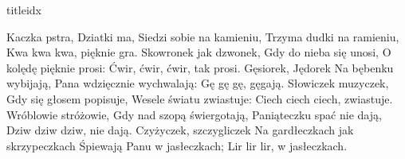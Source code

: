 \documentclass[a5paper, portrait, 12pt]{mwart}
\begin{document}
\begin{songs}{titleidx}


\beginverse
    Kaczka pstra, Dziatki ma,
\endverse
\beginchorus
    Siedzi sobie na kamieniu,
    Trzyma dudki na ramieniu,
    Kwa kwa kwa, pięknie gra.
\endchorus
\beginverse
    Skowronek jak dzwonek,
\endverse
\beginchorus
    Gdy do nieba się unosi,
    O kolędę pięknie prosi:
    Ćwir, ćwir, ćwir, tak prosi.
\endchorus
\beginverse
    Gęsiorek, Jędorek
\endverse
\beginchorus
    Na bębenku wybijają,
    Pana wdzięcznie wychwalają:
    Gę gę gę, gęgają.
\endchorus
\beginverse
    Słowiczek muzyczek,
\endverse
\beginchorus
    Gdy się głosem popisuje,
    Wesele światu zwiastuje:
    Ciech ciech ciech, zwiastuje.
\endchorus
\beginverse
    Wróblowie stróżowie,
\endverse
\beginchorus
    Gdy nad szopą świergotają,
    Paniąteczku spać nie dają,
    Dziw dziw dziw, nie dają. 
\endchorus
\beginverse
    Czyżyczek, szczygliczek
\endverse
\beginchorus
    Na gardłeczkach jak skrzypeczkach
    Śpiewają Panu w jasłeczkach;
    Lir lir lir, w jasłeczkach.
\endchorus
\endsong

\end{songs}
\end{document}
